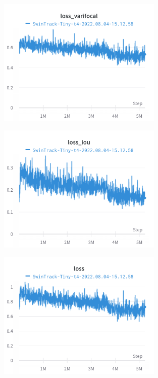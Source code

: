 \begin{figure}[!h]
	\centerline{\includegraphics[width=0.7\textwidth]{charts/Section-2-Panel-9-8yjlirrqx}}
	\caption{
	}
\end{figure}

\begin{figure}[!h]
	\centerline{\includegraphics[width=0.7\textwidth]{charts/Section-2-Panel-13-ffs6mrffa}}
	\caption{
		}
\end{figure}

\begin{figure}[!h]
	\centerline{\includegraphics[width=0.7\textwidth]{charts/Section-2-Panel-11-jg4qpu2ty}}
	\caption{
	}
	\label{fig:}
\end{figure}

